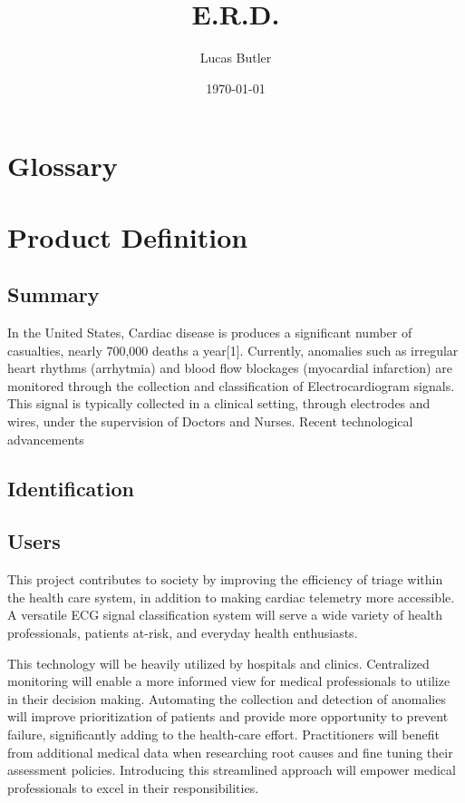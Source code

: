 \documentclass{article}
\title{E.R.D.}
\author{Lucas Butler}
\date{\today}
\begin{document}
\maketitle

\section*{Glossary}
\label{sec:glossary}

\section{Product Definition}

\subsection{Summary}
\quad In the United States, Cardiac disease is produces a significant number of casualties, nearly 700,000 deaths a year[1]. Currently, anomalies such as irregular heart rhythms  (arrhytmia) and blood flow blockages (myocardial infarction) are monitored through the collection and classification of Electrocardiogram signals. This signal is typically collected in a clinical setting, through electrodes and wires, under the supervision of Doctors and Nurses. Recent technological advancements 

\subsection{Identification}

\quad
\subsection{Users}

This project contributes to society by improving the efficiency of triage within the health care system, in addition to making cardiac telemetry more accessible. A versatile ECG signal classification system will serve a wide variety of health professionals, patients at-risk, and everyday health enthusiasts.

This technology will be heavily utilized by hospitals and clinics. Centralized monitoring will enable a more informed view for medical professionals to utilize in their decision making. Automating the collection and detection of anomalies will improve prioritization of patients and provide more opportunity to prevent failure, significantly adding to the health-care effort. Practitioners will benefit from additional medical data when researching root causes and fine tuning their assessment policies. Introducing this streamlined approach will empower medical professionals to excel in their responsibilities.
\end{document}
